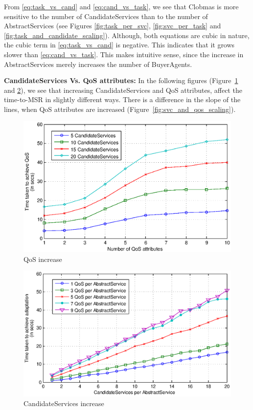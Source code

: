 \documentclass[10pt,journal,compsoc]{IEEEtran}
\begin{document}
From \autoref{eq:task_vs_cand} and \autoref{eq:cand_vs_task}, we see that Clobmas is more sensitive to the number of CandidateServices than to the number of AbstractServices (see Figures \ref{fig:task_per_svc}, \ref{fig:svc_per_task} and \ref{fig:task_and_candidate_scaling}). Although, both equations are cubic in nature, the cubic term in \autoref{eq:task_vs_cand} is negative. This indicates that it grows slower than \autoref{eq:cand_vs_task}. This makes intuitive sense, since the increase in AbstractServices merely increases the number of BuyerAgents. 

\textbf{CandidateServices Vs. QoS attributes:}
In the following figures (Figure~\ref{fig:svc_per_qos} and \ref{fig:qos_per_svc}), we see that increasing CandidateServices and QoS attributes, affect the time-to-MSR in slightly different ways. There is a difference in the slope of the lines, when QoS attributes are increased (Figure~\ref{fig:svc_and_qos_scaling}).

\begin{figure}[htbp]
  \centering
  \includegraphics[clip, trim=0cm 14cm 2cm 6cm, scale=0.42]{Figure15.eps}
  \caption{QoS increase \label{fig:svc_per_qos}}
\end{figure}
\begin{figure}[htbp]
  \centering
  \includegraphics[clip, trim=0cm 14cm 4cm 6cm, scale=0.42]{Figure16.eps}
  \caption{CandidateServices increase \label{fig:qos_per_svc}}
\end{figure}
\end{document}
